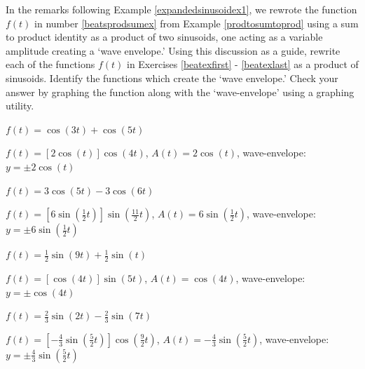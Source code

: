 \documentclass{ximera}
\begin{document}
\begin{question}  In the remarks following Example \ref{expandedsinusoidex1}, we rewrote the function $f(t)$ in number  \ref{beatsprodsumex} from Example \ref{prodtosumtoprod} using a sum to product identity as a product of two sinusoids, one acting as a variable amplitude creating a `wave envelope.'  Using this discussion as a guide,  rewrite each of the functions $f(t)$ in Exercises \ref{beatexfirst} - \ref{beatexlast} as a product of sinusoids. Identify the functions which create the `wave envelope.' Check your answer by graphing  the function along with the `wave-envelope' using a graphing utility.


\begin{problem}\label{beatexfirst}
$f(t) = \cos(3t) + \cos(5t)$

\begin{solution}
$f(t) = [2\cos(t)] \cos(4t)$, $A(t) = 2\cos(t)$, wave-envelope:  $y = \pm 2\cos(t)$
\end{solution}
\end{problem}  

\begin{problem}
$f(t) = 3\cos(5t) - 3\cos(6t)$

\begin{solution}
$f(t) = \left[6\sin \left( \frac{1}{2} t \right) \right] \sin \left( \frac{11}{2} t \right) $, $A(t) = 6\sin \left( \frac{1}{2} t \right) $, wave-envelope:  $y = \pm  6\sin \left( \frac{1}{2} t \right)$
\end{solution}
\end{problem}

\begin{problem}
$f(t) = \frac{1}{2} \sin(9t) + \frac{1}{2} \sin(t)$

\begin{solution}
$f(t) = [\cos(4t)] \sin(5t)$, $A(t) = \cos(4t)$, wave-envelope:  $y = \pm \cos(4t)$
\end{solution}
\end{problem}

\begin{problem}\label{beatexlast}
$f(t) = \frac{2}{3}\sin(2t) - \frac{2}{3}\sin(7t)$

\begin{solution}
$f(t) =  \left[-\frac{4}{3}\sin \left( \frac{5}{2} t \right) \right]\cos \left( \frac{9}{2} t \right) $, $A(t) = -\frac{4}{3}\sin \left( \frac{5}{2} t \right)$, wave-envelope:  $y = \pm \frac{4}{3} \sin \left( \frac{5}{2} t \right)$
\end{solution}
\end{problem}

\end{question}
\end{document}
